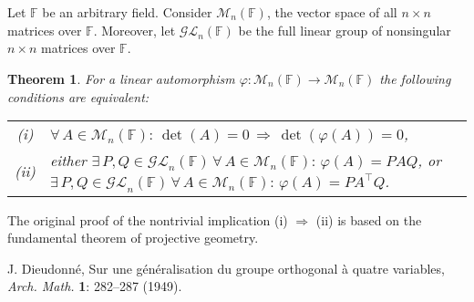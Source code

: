 \documentclass[12pt]{article}
\newtheorem{thm}{Theorem}
\begin{document}
Let $\mathbb{F}$ be an arbitrary field. Consider $\mathcal{M}_n (\mathbb{F})$, the vector space of all $n \times n$ matrices over $\mathbb{F}$. Moreover, let $\mathcal{GL}_n (\mathbb{F})$ be the full linear group of nonsingular $n \times n$ matrices over $\mathbb{F}$.
\begin{thm}
For a linear automorphism $\varphi : \mathcal{M}_n (\mathbb{F}) \longrightarrow \mathcal{M}_n (\mathbb{F})$ the following conditions are equivalent:\\
\begin{tabular}{cl}
(i)&$\displaystyle \forall\, A \in \mathcal{M}_n (\mathbb{F}) :\, \det (A) = 0\, \Rightarrow\, \det (\varphi (A)) = 0$,\\
(ii)&either $\displaystyle \exists\, P, Q \in \mathcal{GL}_n (\mathbb{F})\, \forall\, A \in \mathcal{M}_n (\mathbb{F}) :\, \varphi (A) = P A Q$, or $\displaystyle \exists\, P, Q \in \mathcal{GL}_n (\mathbb{F})\, \forall\, A \in \mathcal{M}_n (\mathbb{F}) :\, \varphi (A) = P A^\top Q$.\\
\end{tabular}
\end{thm}

The original proof \cite{dieud} of the nontrivial implication (i) $\Rightarrow$ (ii) is based on the fundamental theorem of projective geometry.   
\begin{thebibliography}{99}
J. Dieudonn\'e, Sur une g\'en\'eralisation du groupe orthogonal \`a quatre variables, \emph{Arch. Math.} {\bf 1}: 282--287 (1949).
\end{thebibliography}
\end{document}
